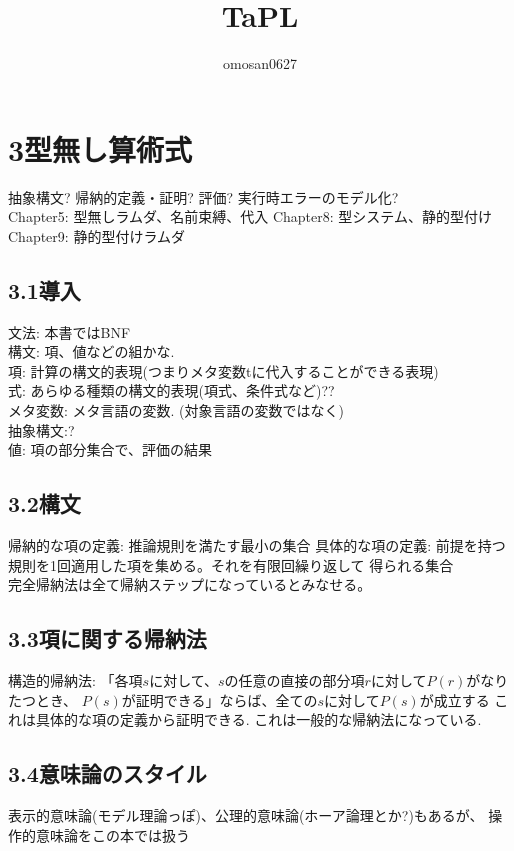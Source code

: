 \documentclass[a4paper,10pt]{article}
\title{TaPL}
\author{omosan0627}
\begin{document}
\maketitle

\section*{3型無し算術式}
抽象構文? 帰納的定義・証明? 評価? 実行時エラーのモデル化?\\
Chapter5: 型無しラムダ、名前束縛、代入 Chapter8: 型システム、静的型付け\\
Chapter9: 静的型付けラムダ\\
\subsection*{3.1導入}
文法: 本書ではBNF\\
構文: 項、値などの組かな.\\
項: 計算の構文的表現(つまりメタ変数tに代入することができる表現)\\
式: あらゆる種類の構文的表現(項式、条件式など)??\\
メタ変数: メタ言語の変数. (対象言語の変数ではなく)\\
抽象構文:?\\
値: 項の部分集合で、評価の結果\\
\subsection*{3.2構文}
帰納的な項の定義: 推論規則を満たす最小の集合
具体的な項の定義: 前提を持つ規則を1回適用した項を集める。それを有限回繰り返して
得られる集合\\
完全帰納法は全て帰納ステップになっているとみなせる。\\
\subsection*{3.3項に関する帰納法}
構造的帰納法:
「各項$s$に対して、$s$の任意の直接の部分項$r$に対して$P(r)$がなりたつとき、
$P(s)$が証明できる」ならば、全ての$s$に対して$P(s)$が成立する
これは具体的な項の定義から証明できる. これは一般的な帰納法になっている.
\subsection*{3.4意味論のスタイル}
表示的意味論(モデル理論っぽ)、公理的意味論(ホーア論理とか?)もあるが、
操作的意味論をこの本では扱う
\end{document}
